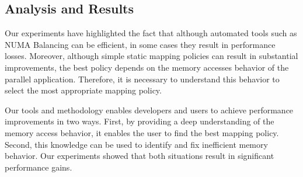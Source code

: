 \subsection{Analysis and Results}

Our experiments have highlighted the fact that although automated tools such
as NUMA Balancing can be efficient, in some cases they result in
performance losses. Moreover, although simple static mapping policies
can result in substantial improvements, the best policy depends on the memory
accesses behavior of the parallel application. Therefore, it is necessary to understand this behavior to
select the most appropriate mapping policy.

Our tools and methodology enables developers and users to achieve performance improvements in two ways. First, by
providing a deep understanding of the memory access behavior, it enables the user to
find the best mapping policy. Second, this knowledge can be used to
identify and fix inefficient memory behavior. Our experiments showed that both
situations result in significant performance gains.


